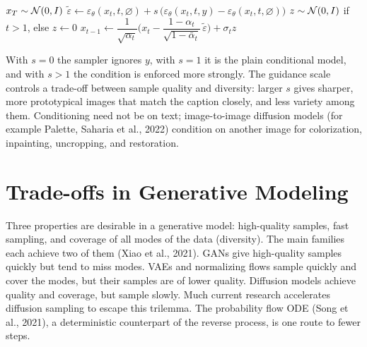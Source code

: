 \begin{algorithm}[H]
\caption{Classifier-Free Guided Sampling}\label{alg:cfg-sample}
\begin{algorithmic}[1]
\State $x_T\sim\mathcal{N}(0,I)$
  \State $\tilde\varepsilon\gets\varepsilon_\theta(x_t,t,\varnothing)+s\,\big(\varepsilon_\theta(x_t,t,y)-\varepsilon_\theta(x_t,t,\varnothing)\big)$
  \State $z\sim\mathcal{N}(0,I)$ if $t>1$, else $z\gets0$
  \State $x_{t-1}\gets\dfrac{1}{\sqrt{\alpha_t}}\Big(x_t-\dfrac{1-\alpha_t}{\sqrt{1-\bar\alpha_t}}\,\tilde\varepsilon\Big)+\sigma_tz$
\EndFor
{}
\end{algorithmic}
\end{algorithm}

With $s=0$ the sampler ignores $y$, with $s=1$ it is the plain conditional model, and with $s>1$ the condition is enforced more strongly. The guidance scale controls a trade-off between sample quality and diversity: larger $s$ gives sharper, more prototypical images that match the caption closely, and less variety among them. Conditioning need not be on text; image-to-image diffusion models (for example Palette, Saharia et al., 2022) condition on another image for colorization, inpainting, uncropping, and restoration.

\section{Trade-offs in Generative Modeling}\label{sec:generative-tradeoffs}

Three properties are desirable in a generative model: high-quality samples, fast sampling, and coverage of all modes of the data (diversity). The main families each achieve two of them (Xiao et al., 2021). GANs give high-quality samples quickly but tend to miss modes. VAEs and normalizing flows sample quickly and cover the modes, but their samples are of lower quality. Diffusion models achieve quality and coverage, but sample slowly. Much current research accelerates diffusion sampling to escape this trilemma. The probability flow ODE (Song et al., 2021), a deterministic counterpart of the reverse process, is one route to fewer steps.

